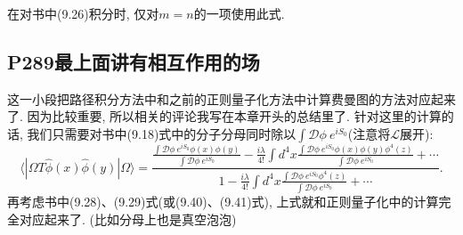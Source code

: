 在对书中(9.26)积分时, 仅对$m=n$的一项使用此式.

\subsection{P289最上面讲有相互作用的场}
这一小段把路径积分方法中和之前的正则量子化方法中计算费曼图的方法对应起来了. 因为比较重要, 所以相关的评论我写在本章开头的总结里了. 针对这里的计算的话, 我们只需要对书中(9.18)式中的分子分母同时除以$\int \mathcal{D}\phi\ e^{iS_0}$(注意将$\mathcal{L}$展开):
\begin{equation}
  \langle | \Omega T \hat{\phi}(x) \hat{\phi}(y) | \Omega \rangle = \frac{\frac{\int \mathcal{D}\phi\ e^{iS_0} \phi(x)\phi(y)}{\int \mathcal{D}\phi\ e^{iS_0}} - \frac{i\lambda}{4!}\int d^4x \frac{\int \mathcal{D}\phi\ e^{iS_0} \phi(x)\phi(y)\phi^4(z)}{\int \mathcal{D}\phi\ e^{iS_0}}+\cdots}{1 - \frac{i\lambda}{4!}\int d^4x \frac{\int \mathcal{D}\phi\ e^{iS_0} \phi^4(z)}{\int \mathcal{D}\phi\ e^{iS_0}}+\cdots}.
\end{equation}
再考虑书中(9.28)、(9.29)式(或(9.40)、(9.41)式), 上式就和正则量子化中的计算完全对应起来了. (比如分母上也是真空泡泡)

